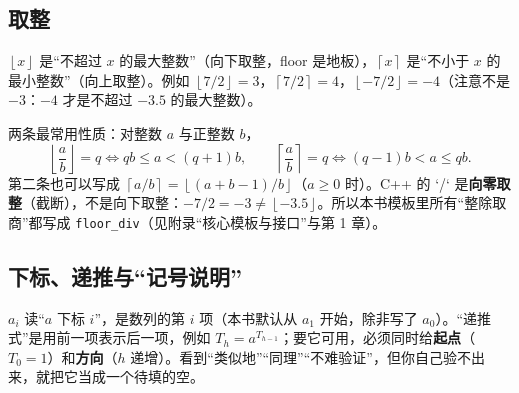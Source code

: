 \documentclass[UTF8,a4paper,11pt,twoside,openright,fontset=fandol]{ctexbook}
\theoremstyle{definition}
\newcommand{\floor}[1]{\left\lfloor #1\right\rfloor}
\newcommand{\ceil}[1]{\left\lceil #1\right\rceil}
\begin{document}
\subsection{取整}
$\floor{x}$ 是“不超过 $x$ 的最大整数”（向下取整，floor 是地板），$\ceil{x}$ 是“不小于 $x$ 的最小整数”（向上取整）。例如 $\floor{7/2}=3$，$\ceil{7/2}=4$，$\floor{-7/2}=-4$（注意不是 $-3$：$-4$ 才是不超过 $-3.5$ 的最大整数）。

两条最常用性质：对整数 $a$ 与正整数 $b$，
\[
\floor{\frac{a}{b}}=q\iff qb\le a<(q+1)b,\qquad \ceil{\frac{a}{b}}=q\iff (q-1)b<a\le qb.
\]
第二条也可以写成 $\ceil{a/b}=\floor{(a+b-1)/b}$（$a\ge0$ 时）。C++ 的 `/` 是\textbf{向零取整}（截断），不是向下取整：$-7/2=-3\ne\floor{-3.5}$。所以本书模板里所有“整除取商”都写成 \texttt{floor\_div}（见附录“核心模板与接口”与第 1 章）。

\subsection{下标、递推与“记号说明”}
$a_i$ 读“$a$ 下标 $i$”，是数列的第 $i$ 项（本书默认从 $a_1$ 开始，除非写了 $a_0$）。“递推式”是用前一项表示后一项，例如 $T_h=a^{T_{h-1}}$；要它可用，必须同时给\textbf{起点}（$T_0=1$）和\textbf{方向}（$h$ 递增）。看到“类似地”“同理”“不难验证”，但你自己验不出来，就把它当成一个待填的空。
\end{document}
